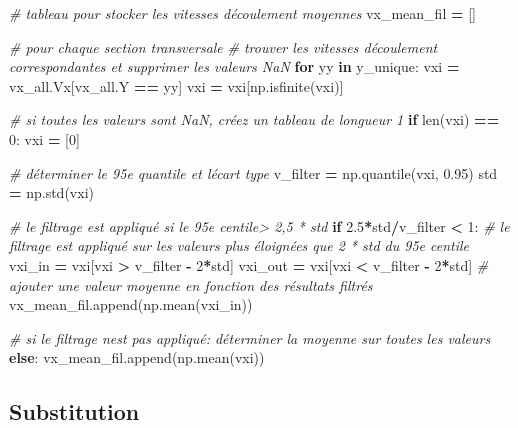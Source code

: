 \documentclass[
]{article}
\newenvironment{Shaded}{\begin{snugshade}}{\end{snugshade}}
\newcommand{\BuiltInTok}[1]{#1}
\newcommand{\CommentTok}[1]{\textcolor[rgb]{0.56,0.35,0.01}{\textit{#1}}}
\newcommand{\ControlFlowTok}[1]{\textcolor[rgb]{0.13,0.29,0.53}{\textbf{#1}}}
\newcommand{\DecValTok}[1]{\textcolor[rgb]{0.00,0.00,0.81}{#1}}
\newcommand{\FloatTok}[1]{\textcolor[rgb]{0.00,0.00,0.81}{#1}}
\newcommand{\KeywordTok}[1]{\textcolor[rgb]{0.13,0.29,0.53}{\textbf{#1}}}
\newcommand{\NormalTok}[1]{#1}
\newcommand{\OperatorTok}[1]{\textcolor[rgb]{0.81,0.36,0.00}{\textbf{#1}}}
\begin{document}
\begin{Shaded}
\begin{Highlighting}[]
\CommentTok{\# tableau pour stocker les vitesses d\textquotesingle{}écoulement moyennes}
\NormalTok{vx\_mean\_fil }\OperatorTok{=}\NormalTok{ []}

\CommentTok{\# pour chaque section transversale}
\CommentTok{\# trouver les vitesses d\textquotesingle{}écoulement correspondantes et supprimer les valeurs NaN}
\ControlFlowTok{for}\NormalTok{ yy }\KeywordTok{in}\NormalTok{ y\_unique:}
\NormalTok{    vxi }\OperatorTok{=}\NormalTok{ vx\_all.Vx[vx\_all.Y }\OperatorTok{==}\NormalTok{ yy]}
\NormalTok{    vxi }\OperatorTok{=}\NormalTok{ vxi[np.isfinite(vxi)]}

    \CommentTok{\# si toutes les valeurs sont NaN, créez un tableau de longueur 1}
    \ControlFlowTok{if} \BuiltInTok{len}\NormalTok{(vxi) }\OperatorTok{==} \DecValTok{0}\NormalTok{:}
\NormalTok{        vxi }\OperatorTok{=}\NormalTok{ [}\DecValTok{0}\NormalTok{]}
    
    \CommentTok{\# déterminer le 95e quantile et l\textquotesingle{}écart type}
\NormalTok{    v\_filter }\OperatorTok{=}\NormalTok{ np.quantile(vxi, }\FloatTok{0.95}\NormalTok{)}
\NormalTok{    std }\OperatorTok{=}\NormalTok{ np.std(vxi)}

    \CommentTok{\# le filtrage est appliqué si le 95e centile\textgreater{} 2,5 * std}
    \ControlFlowTok{if} \FloatTok{2.5}\OperatorTok{*}\NormalTok{std}\OperatorTok{/}\NormalTok{v\_filter }\OperatorTok{\textless{}} \DecValTok{1}\NormalTok{:}
        \CommentTok{\# le filtrage est appliqué sur les valeurs plus éloignées que 2 * std du 95e centile}
\NormalTok{        vxi\_in }\OperatorTok{=}\NormalTok{ vxi[vxi }\OperatorTok{\textgreater{}}\NormalTok{ v\_filter }\OperatorTok{{-}} \DecValTok{2}\OperatorTok{*}\NormalTok{std]}
\NormalTok{        vxi\_out }\OperatorTok{=}\NormalTok{ vxi[vxi }\OperatorTok{\textless{}}\NormalTok{ v\_filter }\OperatorTok{{-}} \DecValTok{2}\OperatorTok{*}\NormalTok{std]}
        \CommentTok{\# ajouter une valeur moyenne en fonction des résultats filtrés}
\NormalTok{        vx\_mean\_fil.append(np.mean(vxi\_in))}

    \CommentTok{\# si le filtrage n\textquotesingle{}est pas appliqué: déterminer la moyenne sur toutes les valeurs}
    \ControlFlowTok{else}\NormalTok{:}
\NormalTok{      vx\_mean\_fil.append(np.mean(vxi))}
\end{Highlighting}
\end{Shaded}

\hypertarget{substitution}{%
\subsection*{Substitution}\label{substitution}}
\end{document}
